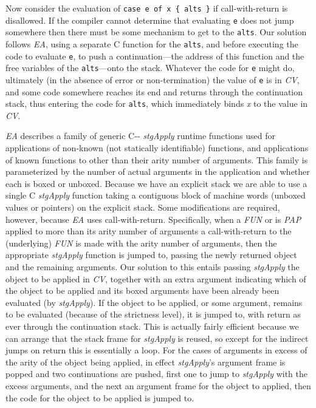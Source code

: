 \documentclass{llncs}
\begin{document}
Now consider the evaluation of \texttt{case e of x \{ alts \}} if call-with-return
is disallowed.  If the compiler cannot determine that evaluating \texttt{e}
does not jump somewhere then there must be some mechanism to get to the
\texttt{alts}.  Our solution follows \emph{EA}, using a separate C function
for the \texttt{alts}, and before executing the code to evaluate \texttt{e},
to push a continuation---the address of this function and the free variables
of the \texttt{alts}---onto the stack.  Whatever the code for \texttt{e} might
do, ultimately (in the absence of error or non-termination) the value of
\texttt{e} is in \emph{CV}, and some code somewhere reaches its end and returns
through the continuation stack, thus entering the code for \texttt{alts},
which immediately binds \emph{x} to the value in \emph{CV}.

\emph{EA} describes a family of generic C-{}- \emph{stgApply} runtime
functions used for applications of non-known (not statically identifiable)
functions, and applications of known functions to other than their arity
number of arguments.  This family is parameterized by the number of actual
arguments in the application and whether each is boxed or unboxed.  Because
we have an explicit stack we are able to use a single C \emph{stgApply} function
taking a contiguous block of machine words (unboxed values or
pointers) on the explicit stack.  Some modifications are required, however,
because \emph{EA} uses call-with-return.  Specifically, when a \emph{FUN} or is
\emph{PAP} applied to more than its arity number of arguments
a call-with-return to the (underlying) \emph{FUN} is made with the arity
number of arguments, then the appropriate \emph{stgApply} function is jumped
to, passing the newly returned object and the remaining arguments.  Our
solution to this entails passing \emph{stgApply} the object to be applied in
\emph{CV}, together with an extra argument indicating which of the object
to be applied and its boxed arguments have been already been evaluated (by
\emph{stgApply}).  If the object to be applied, or some argument, remains to
be evaluated (because of the strictness level), it is jumped to, with
return as ever through the continuation stack.  This is actually fairly
efficient because we can arrange that the stack frame for \emph{stgApply}
is reused, so except for the indirect jumps on return this is essentially
a loop.  For the cases of arguments in excess of the arity of the object
being applied, in effect \emph{stgApply}'s argument frame is popped and
two continuations are pushed, first one to jump to \emph{stgApply} with
the excess arguments, and the next an argument frame for the object to
applied, then the code for the object to be applied is jumped to.
\end{document}
